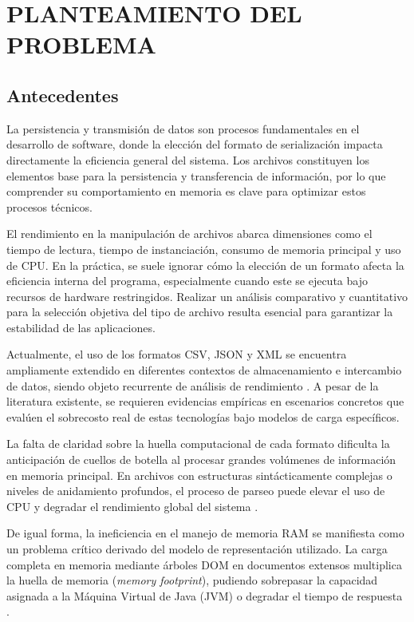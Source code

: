 \section{PLANTEAMIENTO DEL PROBLEMA}

\subsection{Antecedentes}

La persistencia y transmisión de datos son procesos fundamentales en el desarrollo de software, donde la elección del formato de serialización impacta directamente la eficiencia general del sistema. Los archivos constituyen los elementos base para la persistencia y transferencia de información, por lo que comprender su comportamiento en memoria es clave para optimizar estos procesos técnicos.

El rendimiento en la manipulación de archivos abarca dimensiones como el tiempo de lectura, tiempo de instanciación, consumo de memoria principal y uso de CPU. En la práctica, se suele ignorar cómo la elección de un formato afecta la eficiencia interna del programa, especialmente cuando este se ejecuta bajo recursos de hardware restringidos. Realizar un análisis comparativo y cuantitativo para la selección objetiva del tipo de archivo resulta esencial para garantizar la estabilidad de las aplicaciones.

Actualmente, el uso de los formatos CSV, JSON y XML se encuentra ampliamente extendido en diferentes contextos de almacenamiento e intercambio de datos, siendo objeto recurrente de análisis de rendimiento \cite{ieee_icoailo_2025, ieee_les_2024}. A pesar de la literatura existente, se requieren evidencias empíricas en escenarios concretos que evalúen el sobrecosto real de estas tecnologías bajo modelos de carga específicos.

La falta de claridad sobre la huella computacional de cada formato dificulta la anticipación de cuellos de botella al procesar grandes volúmenes de información en memoria principal. En archivos con estructuras sintácticamente complejas o niveles de anidamiento profundos, el proceso de parseo puede elevar el uso de CPU y degradar el rendimiento global del sistema \cite{ieee_parsing_2008}.

De igual forma, la ineficiencia en el manejo de memoria RAM se manifiesta como un problema crítico derivado del modelo de representación utilizado. La carga completa en memoria mediante árboles DOM en documentos extensos multiplica la huella de memoria (\textit{memory footprint}), pudiendo sobrepasar la capacidad asignada a la Máquina Virtual de Java (JVM) o degradar el tiempo de respuesta \cite{dke_memory_2006, hoxmeier2000system}.

